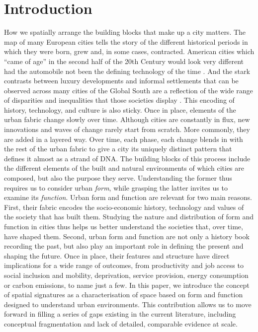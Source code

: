 \section{Introduction}
\label{sec:intro}

How we spatially arrange the building blocks that make up a city matters.
%
The map of many European cities tells the story of the different historical
periods in which they were born, grew and, in some cases, contracted.
%
American cities which ``came of age'' in the second half of the 20th Century
would look very different had the automobile not been the defining
technology of the time \citep{jacobs2016death}.
%
And the stark contrasts between luxury developments and informal settlements
that can be observed across many cities of the Global South are a reflection
of the wide range of disparities and inequalities that those societies
display \citep{alsayyad2003urban}.
%
This encoding of history, technology, and culture is also sticky. Once in place,
elements of the urban fabric change slowly over time. Although cities are constantly in flux, new
innovations and waves of change rarely start from scratch. More commonly, they
are added in a layered way. Over time, each phase, each change blends in with the rest
of the urban fabric to give a city its uniquely distinct pattern that defines
it almost as a strand of DNA.
The building blocks of this process include the different
elements of the built and natural environments of which cities are composed,
but also the purpose they serve.
Understanding the former thus requires us to consider urban \textit{form}, while
grasping the latter invites us to examine its \textit{function}.
Urban form and function are relevant for two main reasons. First, their fabric
encodes the socio-economic history, technology and values
of the society that has built them.
%
Studying the nature and distribution
of form and function in cities thus helps us better understand the societies
that, over time, have shaped them.
Second, urban form and function are
not only a history book recording the past, but also play an important role in
defining the present and shaping the future.
%
Once in place, their features and structure have direct implications for a
wide range of outcomes, from productivity and job access to social inclusion
and mobility, deprivation, service provision, energy consumption or carbon
emissions, to name just a few.
%
In this paper, we introduce the concept of spatial signatures as a characterisation of
space based on form and function designed to understand urban environments.
This contribution allows us to move forward in filling a series of gaps existing in the
current literature, including conceptual fragmentation and lack of detailed,
comparable evidence at scale.

